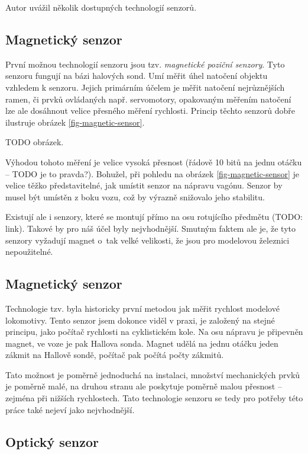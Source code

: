 Autor uvážil několik dostupných technologií senzorů.

\subsection{Magnetický senzor}

První možnou technologií senzoru jsou tzv. \textit{magnetické poziční senzory}.
Tyto senzoru fungují na bázi halových sond. Umí měřit úhel natočení objektu
vzhledem k senzoru. Jejich primárním účelem je měřit natočení nejrůznějších
ramen, či prvků ovládaných např. servomotory, opakovaným měřením natočení lze
ale dosáhnout velice přesného měření rychlosti. Princip těchto senzorů
dobře ilustruje obrázek \ref{fig-magnetic-sensor}.

TODO obrázek.

Výhodou tohoto měření je velice vysoká přesnost (řádově 10 bitů na jednu otáčku
-- TODO je to pravda?). Bohužel, při pohledu na obrázek
\ref{fig-magnetic-sensor} je velice těžko představitelné, jak umístit senzor na
nápravu vagónu. Senzor by musel být umístěn z boku vozu, což by výrazně
snižovalo jeho stabilitu.

Existují ale i senzory, které se montují přímo na osu rotujícího předmětu
(TODO: link). Takové by pro náš účel byly nejvhodnější. Smutným faktem ale je,
že tyto senzory vyžadují magnet o~tak velké velikosti, že jsou pro modelovou
železnici nepoužitelné.

\subsection{Magnetický senzor }

Technologie tzv.  byla historicky první metodou jak měřit
rychlost modelové lokomotivy. Tento senzor jsem dokonce viděl v praxi, je
založený na stejné principu, jako počítač rychlosti na cyklistickém kole.
Na osu nápravu je připevněn magnet, ve voze je pak Hallova sonda. Magnet udělá
na jednu otáčku jeden zákmit na Hallově sondě, počítač pak počítá počty zákmitů.

Tato možnost je poměrně jednoduchá na instalaci, množství mechanických prvků
je poměrně malé, na druhou stranu ale poskytuje poměrně malou přesnost --
zejména při nižších rychlostech. Tato technologie senzoru se tedy pro potřeby
této práce také nejeví jako nejvhodnější.

\subsection{Optický senzor}

